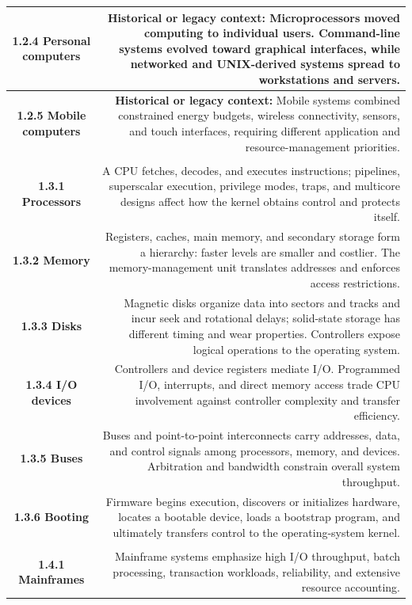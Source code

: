 \documentclass[10pt,letterpaper]{article}
\begin{document}
\begin{longtable}{C N}
\textbf{1.2.4 Personal computers} & \textcolor{legacy}{\textbf{Historical or legacy context:}} Microprocessors moved computing to individual users. Command-line systems evolved toward graphical interfaces, while networked and UNIX-derived systems spread to workstations and servers.\\\hline
\textbf{1.2.5 Mobile computers} & \textcolor{legacy}{\textbf{Historical or legacy context:}} Mobile systems combined constrained energy budgets, wireless connectivity, sensors, and touch interfaces, requiring different application and resource-management priorities.\\\hline
{}\\*\hline
\textbf{1.3.1 Processors} & A CPU fetches, decodes, and executes instructions; pipelines, superscalar execution, privilege modes, traps, and multicore designs affect how the kernel obtains control and protects itself.\\\hline
\textbf{1.3.2 Memory} & Registers, caches, main memory, and secondary storage form a hierarchy: faster levels are smaller and costlier. The memory-management unit translates addresses and enforces access restrictions.\\\hline
\textbf{1.3.3 Disks} & Magnetic disks organize data into sectors and tracks and incur seek and rotational delays; solid-state storage has different timing and wear properties. Controllers expose logical operations to the operating system.\\\hline
\textbf{1.3.4 I/O devices} & Controllers and device registers mediate I/O. Programmed I/O, interrupts, and direct memory access trade CPU involvement against controller complexity and transfer efficiency.\\\hline
\textbf{1.3.5 Buses} & Buses and point-to-point interconnects carry addresses, data, and control signals among processors, memory, and devices. Arbitration and bandwidth constrain overall system throughput.\\\hline
\textbf{1.3.6 Booting} & Firmware begins execution, discovers or initializes hardware, locates a bootable device, loads a bootstrap program, and ultimately transfers control to the operating-system kernel.\\\hline
{}\\*\hline
\textbf{1.4.1 Mainframes} & Mainframe systems emphasize high I/O throughput, batch processing, transaction workloads, reliability, and extensive resource accounting.\\\hline

\end{longtable}
\end{document}
